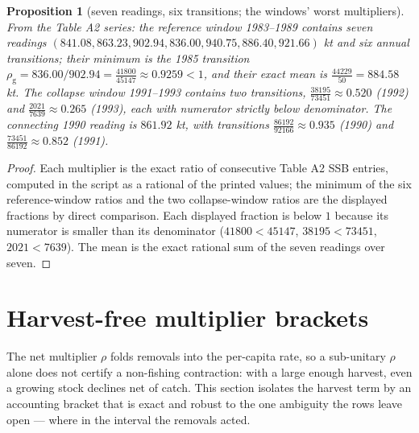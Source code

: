 \documentclass[10pt,twocolumn]{article}
\theoremstyle{plain}
\newtheorem{proposition}[theorem]{Proposition}
\theoremstyle{remark}
\begin{document}
\begin{proposition}[seven readings, six transitions; the windows'
worst multipliers]
\label{prop:windows}
From the Table A2 series: the reference window 1983--1989 contains
seven readings \((841.08, 863.23, 902.94, 836.00, 940.75, 886.40,
921.66)\) kt and six annual transitions; their minimum is the 1985
transition \(\rho_{\mathrm{g}} = 836.00/902.94 =
\tfrac{41800}{45147} \approx 0.9259 < 1\), and their exact mean is
\(\tfrac{44229}{50} = 884.58\) kt. The collapse window 1991--1993
contains two transitions,
\(\tfrac{38195}{73451} \approx 0.520\) (1992) and
\(\tfrac{2021}{7639} \approx 0.265\) (1993), each with numerator
strictly below denominator. The connecting 1990 reading is
\(861.92\) kt, with transitions
\(\tfrac{86192}{92166} \approx 0.935\) (1990) and
\(\tfrac{73451}{86192} \approx 0.852\) (1991).
\end{proposition}

\begin{proof}
Each multiplier is the exact ratio of consecutive Table A2 SSB entries,
computed in the script as a rational of the printed values; the
minimum of the six reference-window ratios and the two collapse-window
ratios are the displayed fractions by direct comparison. Each
displayed fraction is below \(1\) because its numerator is smaller
than its denominator (\(41800 < 45147\), \(38195 < 73451\),
\(2021 < 7639\)). The mean is the exact rational sum of the seven
readings over seven.
\end{proof}

\section{Harvest-free multiplier brackets}\label{brackets}

The net multiplier \(\rho\) folds removals into the per-capita rate,
so a sub-unitary \(\rho\) alone does not certify a non-fishing
contraction: with a large enough harvest, even a growing stock
declines net of catch. This section isolates the harvest term by an
accounting bracket that is exact and robust to the one ambiguity the
rows leave open --- where in the interval the removals acted.
\end{document}
